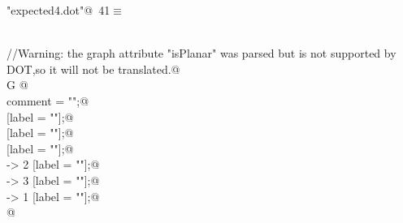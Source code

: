 \documentclass[a4paper]{report}
\begin{document}
\begin{flushleft} \small
\begin{minipage}{\linewidth}\label{scrap41}\raggedright\small
{} \verb@"expected4.dot"@\nobreak\ {\footnotesize {41}}$\equiv$
\vspace{-1ex}
\begin{list}{}{} \item
\mbox{}\verb@@\\
\mbox{}\verb@//Warning: the graph attribute "isPlanar" was parsed but is not supported by DOT,so it will not be translated.@\\
\mbox{}\verb@digraph G {@\\
\mbox{}\verb@        comment = "";@\\
\mbox{} [label = ""];@\\
\mbox{} [label = ""];@\\
\mbox{} [label = ""];@\\
\mbox{} -> 2 [label = ""];@\\
\mbox{} -> 3 [label = ""];@\\
\mbox{} -> 1 [label = ""];@\\
\mbox{}\verb@}@\\
\mbox{}\verb@@{\NWsep}
\end{list}
\vspace{-1.5ex}
\footnotesize
\begin{list}{}{\setlength{\itemsep}{-\parsep}\setlength{\itemindent}{-\leftmargin}}

\item{}
\end{list}
\end{minipage}\vspace{4ex}
\end{flushleft}
\newpage
\end{document}
